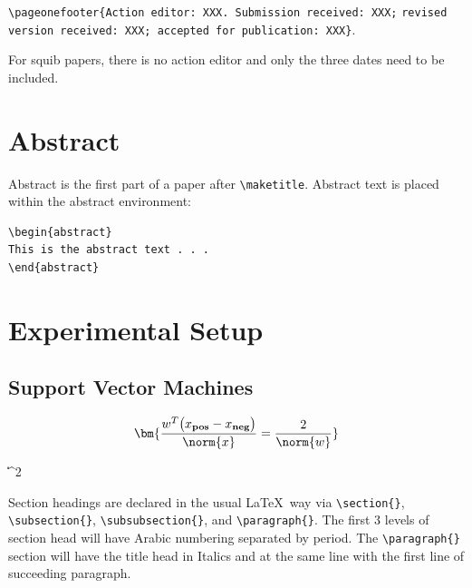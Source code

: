 \documentclass{clv3}
\begin{document}
\noindent \verb|\pageonefooter{Action editor: XXX. Submission received: XXX;| \newline \hspace*{1em} \verb|revised version received: XXX; accepted for publication: XXX}|. %

\noindent For squib papers, there is no action editor and only the three dates need to be included.

\section{Abstract}

Abstract is the first part of a paper after \verb|\maketitle|. Abstract text is 
placed within the abstract environment:

\begin{verbatim}
\begin{abstract}
This is the abstract text . . .
\end{abstract}
\end{verbatim}

\section{Experimental Setup}

\subsection{Support Vector Machines}


\[\bm{\frac{w^T\bigl(x_{\textbf{\scriptsize pos}}-x_{\textbf{\scriptsize neg}}\bigr)}{\norm{x}}=\frac{\text{2}}{\norm{w}}} \]

 \quad {} \|\|^2


Section headings are declared in the usual \LaTeX\ way via \verb|\section{}|, 
\verb|\subsection{}|, \verb|\subsubsection{}|, and \verb|\paragraph{}|. The 
first 3 levels of section head will have Arabic numbering separated 
by period. The \verb|\paragraph{}| section will have the title head in Italics 
and at the same line with the first line of succeeding paragraph.
\end{document}
